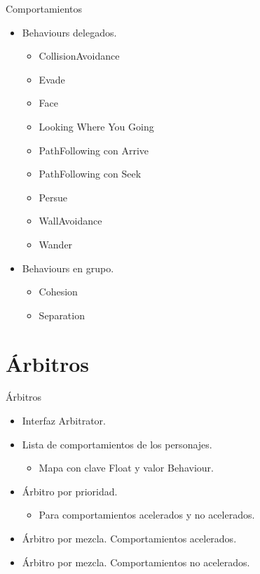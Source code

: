 \documentclass[10pt]{beamer}
\begin{document}
\begin{frame}{Comportamientos}
\begin{itemize}[<+- | alert@+>]
	\item Behaviours delegados.
 	\begin{itemize}[<+- | alert@+>]
  		\item CollisionAvoidance \item Evade \item Face \item Looking Where You Going \item PathFollowing con Arrive \item PathFollowing con Seek \item Persue \item WallAvoidance \item Wander 
 	\end{itemize}
 	\item Behaviours en grupo.
 	\begin{itemize}[<+- | alert@+>]
  		\item Cohesion \item Separation
 	\end{itemize}
\end{itemize}
\end{frame}


\section{Árbitros}
\begin{frame}{Árbitros}
\begin{itemize}[<+- | alert@+>]
	\item Interfaz Arbitrator.
	\item Lista de comportamientos de los personajes.
	\begin{itemize}[<+- | alert@+>]
  		\item Mapa con clave Float y valor Behaviour.
 	\end{itemize}
	
	\item Árbitro por prioridad.
	\begin{itemize}[<+- | alert@+>]
  		\item Para comportamientos acelerados y no acelerados.
 	\end{itemize}
	\item Árbitro por mezcla. Comportamientos acelerados.
	\item Árbitro por mezcla. Comportamientos no acelerados.
\end{itemize}
\end{frame}
\end{document}

